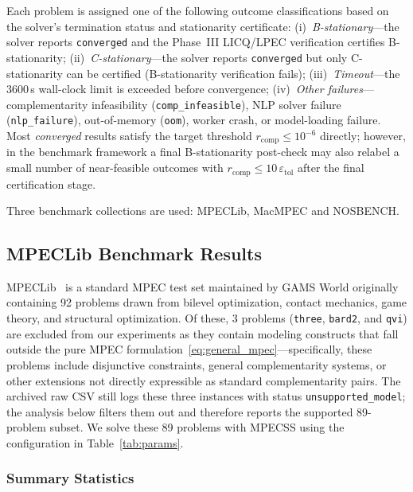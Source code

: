 Each problem is assigned one of the following outcome classifications based on the solver's termination status and stationarity certificate:
(i)~\emph{B-stationary}---the solver reports \texttt{converged} and the Phase~III LICQ/LPEC verification certifies B-stationarity;
(ii)~\emph{C-stationary}---the solver reports \texttt{converged} but only C-stationarity can be certified (B-stationarity verification fails);
(iii)~\emph{Timeout}---the 3600\,s wall-clock limit is exceeded before convergence;
(iv)~\emph{Other failures}---complementarity infeasibility
(\texttt{comp\_infeasible}), NLP solver failure
(\texttt{nlp\_failure}), out-of-memory (\texttt{oom}), worker crash, or
model-loading failure. Most \emph{converged} results satisfy the target
threshold $r_{\mathrm{comp}} \leq 10^{-6}$ directly; however, in the
benchmark framework a final B-stationarity post-check may also relabel a
small number of near-feasible outcomes with
$r_{\mathrm{comp}} \leq 10\,\varepsilon_{\mathrm{tol}}$ after the final
certification stage.

Three benchmark collections are used: MPECLib, MacMPEC and NOSBENCH.


\subsection{MPECLib Benchmark Results}
\label{sec:mpeclib}

MPECLib~\cite{MPECLib} is a standard MPEC test set maintained by GAMS
World originally containing 92 problems drawn from bilevel optimization,
contact mechanics, game theory, and structural optimization.  Of these,
3 problems (\texttt{three}, \texttt{bard2}, and \texttt{qvi})
are excluded from our experiments as they contain modeling constructs
that fall outside the pure MPEC formulation~\eqref{eq:general_mpec}---specifically,
these problems include disjunctive constraints, general complementarity
systems, or other extensions not directly expressible as standard
complementarity pairs.  The archived raw CSV still logs these three
instances with status \texttt{unsupported\_model}; the analysis below
filters them out and therefore reports the supported 89-problem subset.
We solve these 89 problems with MPECSS using the configuration in
Table~\ref{tab:params}.


\subsubsection{Summary Statistics}
\label{sec:mpeclib_summary}

